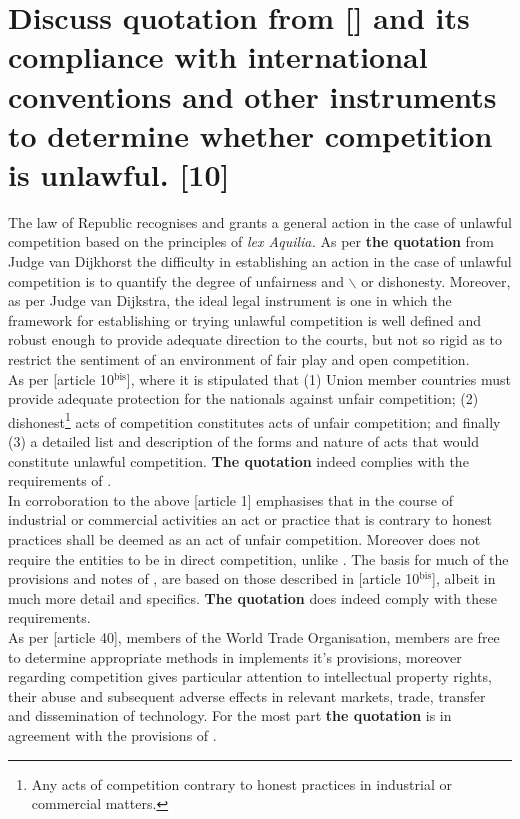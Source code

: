 \documentclass[11pt]{article}
\begin{document}
\section{Discuss quotation from [] \cite{dijkhorst81_atlas_v_pikkewyn} and its compliance with international conventions and other instruments to determine whether competition is unlawful. [10]}
\label{sec:org53f9441}

The law of Republic recognises and grants a general action in the case of
unlawful competition based on the principles of \emph{lex Aquilia.} As per \textbf{the
quotation} from Judge van Dijkhorst \cite{dijkhorst81_atlas_v_pikkewyn} the
difficulty in establishing an action in the case of unlawful competition is to
quantify the degree of unfairness and $\backslash$ or dishonesty. Moreover, as per Judge
van Dijkstra, the ideal legal instrument is one in which the framework for
establishing or trying unlawful competition is well defined and robust enough
to provide adequate direction to the courts, but not so rigid as to restrict
the sentiment of an environment of fair play and open competition.\\

As per [article 10\(^{\text{bis}}\)]\cite{wipo83_paris_conve_protect_ip}, where it is
stipulated that (1) Union member countries must provide adequate protection for
the nationals against unfair competition; (2) dishonest\footnote{Any acts of
competition contrary to honest practices in industrial or commercial matters.}
acts of competition constitutes acts of unfair competition; and finally (3) a
detailed list and description of the forms and nature of acts that would
constitute unlawful competition. \textbf{The quotation} indeed complies with the
requirements of .\\

In corroboration to the above [article 1]\cite{wipo96_model_provi_unfair_comp}
emphasises that in the course of industrial or commercial activities an act or
practice that is contrary to honest practices shall be deemed as an act of
unfair competition. Moreover \cite{wipo96_model_provi_unfair_comp} does not
require the entities to be in direct competition, unlike
\cite{wipo83_paris_conve_protect_ip}. The basis for much of the provisions and
notes of , are based on those
described in [article 10\(^{\text{bis}}\)]\cite{wipo83_paris_conve_protect_ip}, albeit in much
more detail and specifics. \textbf{The quotation} does indeed comply with these
requirements.\\

As per [article 40]\cite{wto17_trips}, members of the World Trade Organisation,
members are free to determine appropriate methods in implements it's
provisions, moreover regarding competition \cite{wto17_trips} gives particular
attention to intellectual property rights, their abuse and subsequent adverse
effects in relevant markets, trade, transfer and dissemination of
technology. For the most part \textbf{the quotation} is in agreement with the
provisions of \cite{wto17_trips}.


\printbibliography
\end{document}
